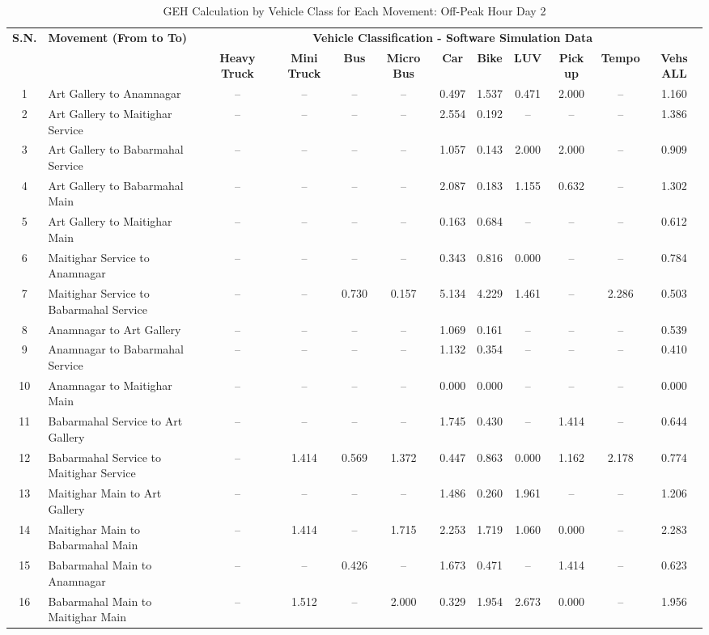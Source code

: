 \begin{landscape}
\begin{table}[h]
\centering
\caption{GEH Calculation by Vehicle Class for Each Movement: Off-Peak Hour Day 2}
\small
\setlength{\tabcolsep}{5pt}

\begin{tabular}{|c|p{6cm}|c|c|c|c|c|c|c|c|c|c|}
\hline
\textbf{S.N.} & \textbf{Movement (From to To)} & \multicolumn{10}{c|}{\textbf{Vehicle Classification - Software Simulation Data}} \\
\cline{3-12}
& & \textbf{Heavy Truck} & \textbf{Mini Truck} & \textbf{Bus} & \textbf{Micro Bus} & \textbf{Car} & \textbf{Bike} & \textbf{LUV} & \textbf{Pick up} & \textbf{Tempo} & \textbf{Vehs ALL} \\
\hline
1 & Art Gallery to Anamnagar & -- & -- & -- & -- & 0.497 & 1.537 & 0.471 & 2.000 & -- & 1.160 \\
\hline
2 & Art Gallery to Maitighar Service & -- & -- & -- & -- & 2.554 & 0.192 & -- & -- & -- & 1.386 \\
\hline
3 & Art Gallery to Babarmahal Service & -- & -- & -- & -- & 1.057 & 0.143 & 2.000 & 2.000 & -- & 0.909 \\
\hline
4 & Art Gallery to Babarmahal Main & -- & -- & -- & -- & 2.087 & 0.183 & 1.155 & 0.632 & -- & 1.302 \\
\hline
5 & Art Gallery to Maitighar Main & -- & -- & -- & -- & 0.163 & 0.684 & -- & -- & -- & 0.612 \\
\hline
6 & Maitighar Service to Anamnagar & -- & -- & -- & -- & 0.343 & 0.816 & 0.000 & -- & -- & 0.784 \\
\hline
7 & Maitighar Service to Babarmahal Service & -- & -- & 0.730 & 0.157 & 5.134 & 4.229 & 1.461 & -- & 2.286 & 0.503 \\
\hline
8 & Anamnagar to Art Gallery & -- & -- & -- & -- & 1.069 & 0.161 & -- & -- & -- & 0.539 \\
\hline
9 & Anamnagar to Babarmahal Service & -- & -- & -- & -- & 1.132 & 0.354 & -- & -- & -- & 0.410 \\
\hline
10 & Anamnagar to Maitighar Main & -- & -- & -- & -- & 0.000 & 0.000 & -- & -- & -- & 0.000 \\
\hline
11 & Babarmahal Service to Art Gallery & -- & -- & -- & -- & 1.745 & 0.430 & -- & 1.414 & -- & 0.644 \\
\hline
12 & Babarmahal Service to Maitighar Service & -- & 1.414 & 0.569 & 1.372 & 0.447 & 0.863 & 0.000 & 1.162 & 2.178 & 0.774 \\
\hline
13 & Maitighar Main to Art Gallery & -- & -- & -- & -- & 1.486 & 0.260 & 1.961 & -- & -- & 1.206 \\
\hline
14 & Maitighar Main to Babarmahal Main & -- & 1.414 & -- & 1.715 & 2.253 & 1.719 & 1.060 & 0.000 & -- & 2.283 \\
\hline
15 & Babarmahal Main to Anamnagar & -- & -- & 0.426 & -- & 1.673 & 0.471 & -- & 1.414 & -- & 0.623 \\
\hline
16 & Babarmahal Main to Maitighar Main & -- & 1.512 & -- & 2.000 & 0.329 & 1.954 & 2.673 & 0.000 & -- & 1.956 \\
\hline



\end{tabular}
\end{table}
\end{landscape}
